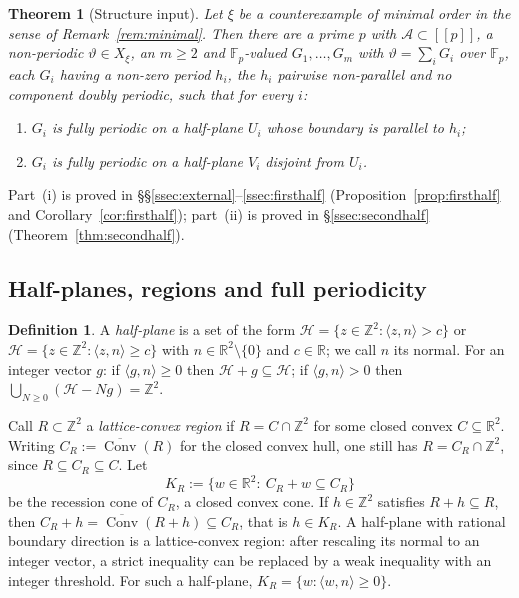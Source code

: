 \documentclass[11pt,reqno]{amsart}
\theoremstyle{plain}
\newtheorem{thm}{Theorem}[section]
\theoremstyle{definition}
\theoremstyle{remark}
\theoremstyle{plain}
\theoremstyle{remark}
\theoremstyle{definition}
\newtheorem*{dfnhalf}{Definition}
\numberwithin{equation}{section}
\DeclareMathOperator{\Conv}{Conv}
\newcommand{\R}{\mathbb{R}}
\newcommand{\Z}{\mathbb{Z}}
\newcommand{\Fp}{\mathbb{F}_p}
\newcommand{\cA}{\mathcal{A}}
\newcommand{\cH}{\mathcal{H}}
\newcommand{\dbr}[1]{[\![#1]\!]}
\begin{document}
\begin{thm}[Structure input]\label{thm:structure}
Let $\xi$ be a counterexample of minimal order in the sense of
Remark~\ref{rem:minimal}.  Then there are a prime $p$ with $\cA\subset\dbr{p}$,
a non-periodic $\vartheta\in X_\xi$, an $m\ge2$ and $\Fp$-valued
$G_1,\dots,G_m$ with $\vartheta=\sum_iG_i$ over $\Fp$, each $G_i$ having a
non-zero period $h_i$, the $h_i$ pairwise non-parallel and no component doubly
periodic, such that for every $i$:
\begin{enumerate}
\item[\textup{(i)}] $G_i$ is fully periodic on a half-plane $U_i$ whose
boundary is parallel to $h_i$;
\item[\textup{(ii)}] $G_i$ is fully periodic on a half-plane $V_i$ disjoint
from $U_i$.
\end{enumerate}
\end{thm}

Part~(i) is proved in \S\S\ref{ssec:external}--\ref{ssec:firsthalf}
(Proposition~\ref{prop:firsthalf} and Corollary~\ref{cor:firsthalf}); part~(ii)
is proved in \S\ref{ssec:secondhalf} (Theorem~\ref{thm:secondhalf}).

\subsection{Half-planes, regions and full periodicity}\label{ssec:halfplanes}

\begin{dfnhalf}
A \emph{half-plane} is a set of the form
$\cH=\{z\in\Z^2:\langle z,n\rangle>c\}$ or
$\cH=\{z\in\Z^2:\langle z,n\rangle\ge c\}$ with $n\in\R^2\setminus\{0\}$ and
$c\in\R$; we call $n$ its normal.  For an integer vector $g$: if
$\langle g,n\rangle\ge0$ then $\cH+g\subseteq\cH$; if $\langle g,n\rangle>0$
then $\bigcup_{N\ge0}(\cH-Ng)=\Z^2$.
\end{dfnhalf}

Call $R\subset\Z^2$ a \emph{lattice-convex region} if $R=C\cap\Z^2$ for some
closed convex $C\subseteq\R^2$.  Writing $C_R:=\overline{\Conv}(R)$ for the
closed convex hull, one still has $R=C_R\cap\Z^2$, since $R\subseteq
C_R\subseteq C$.  Let
\[K_R:=\{w\in\R^2:\ C_R+w\subseteq C_R\}\]
be the recession cone of $C_R$, a closed convex cone.  If $h\in\Z^2$ satisfies
$R+h\subseteq R$, then $C_R+h=\overline{\Conv}(R+h)\subseteq C_R$, that is
$h\in K_R$.  A half-plane with rational boundary direction is a
lattice-convex region: after rescaling its normal to an integer vector, a strict
inequality can be replaced by a weak inequality with an integer threshold.
For such a half-plane, $K_R=\{w:\langle w,n\rangle\ge0\}$.
\end{document}
